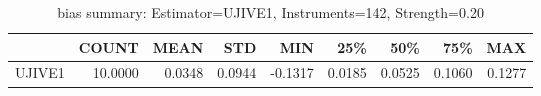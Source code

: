 \begin{table}[ht]
\centering
\caption{bias summary: Estimator=UJIVE1, Instruments=142, Strength=0.20}
\begin{tabular}{lrrrrrrrr}
\toprule
 & COUNT & MEAN & STD & MIN & 25\% & 50\% & 75\% & MAX \\
\midrule
UJIVE1 & 10.0000 & 0.0348 & 0.0944 & -0.1317 & 0.0185 & 0.0525 & 0.1060 & 0.1277 \\
\bottomrule
\end{tabular}
\end{table}
